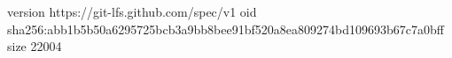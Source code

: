 version https://git-lfs.github.com/spec/v1
oid sha256:abb1b5b50a6295725bcb3a9bb8bee91bf520a8ea809274bd109693b67c7a0bff
size 22004

